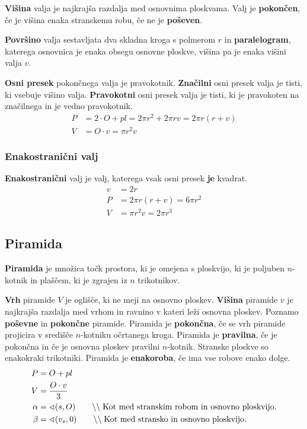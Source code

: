 \documentclass[a4paper,oneside,12pt,fleqn]{article}
\newcommand\krat\cdot
\newcommand{\comment}[1]{\ensuremath{\qquad\backslash\backslash\;}\textnormal{#1}}
\numberwithin{equation}{section}
\begin{document}
\textbf{Višina} valja je najkrajša razdalja med osnovnima ploskvama. Valj je
\textbf{pokončen}, če je višina
enaka stranskemu robu, če ne je \textbf{poševen}.

\textbf{Površino} valja sestavljata dva skladna kroga s polmerom $r$ in
\textbf{paralelogram}, katerega
osnovnica je enaka obsegu osnovne ploskve, višina pa je enaka višini valja $v$.

\textbf{Osni presek} pokončnega valja je pravokotnik. \textbf{Značilni} osni presek valja je tisti, ki
vsebuje višino valja. \textbf{Pravokotni} osni presek valja je tisti, ki je pravokoten na
značilnega in je vedno pravokotnik.
\begin{align*}
  P &= 2 \krat O + pl = 2\pi r^2 + 2\pi rv = 2\pi r(r+v) \\
  V &= O \krat v = \pi r^2v
\end{align*}

\subsubsection{Enakostranični valj}
\label{sec:tel:valj:enak}
\textbf{Enakostranični} valj je valj, katerega vsak osni presek \textbf{je} kvadrat.
\begin{align*}
  v &= 2r \\
  P &= 2\pi r(r+v) = 6\pi r^2 \\
  V &= \pi r^2v = 2\pi r^3
\end{align*}

\subsection{Piramida}
\label{sec:tel:pir}
\textbf{Piramida} je množica točk prostora, ki je omejena s ploskvijo, ki je poljuben $n$-kotnik in plaščem, ki
je zgrajen iz $n$ trikotnikov.

\textbf{Vrh} piramide $V$ je oglišče, ki ne meji na osnovno ploskev. \textbf{Višina}
piramide $v$ je najkrajša razdalja med 
vrhom in ravnino v kateri leži osnovna ploskev. Poznamo \textbf{poševne} in
\textbf{pokončne} piramide. Piramida je \textbf{pokončna}, 
če se vrh piramide projicira v središče $n$-kotniku očrtanega kroga. Piramida je
\textbf{pravilna}, če je pokončna in če je osnovna ploskev pravilni $n$-kotnik. 
Stranske ploskve so enakokraki trikotniki. Piramida je \textbf{enakoroba}, če ima 
vse robove enako dolge.
\begin{align*}
  P &= O + pl \\
  V &= \frac{O \krat v}{3} \\
  \alpha &= \sphericalangle(s,O) \comment{Kot med stranskim robom in osnovno ploskvijo.} \\
  \beta &= \sphericalangle(v_s,0) \comment{Kot med stransko in osnovno ploskvijo.}
\end{align*}
\end{document}
